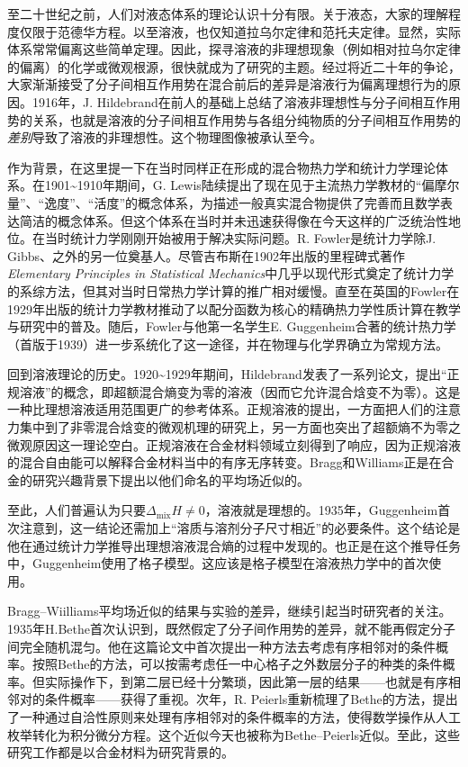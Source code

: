 \documentclass[main.tex]{subfiles}
\begin{document}
至二十世纪之前，人们对液态体系的理论认识十分有限。关于液态，大家的理解程度仅限于范德华方程。以至溶液，也仅知道拉乌尔定律和范托夫定律。显然，实际体系常常偏离这些简单定理。因此，探寻溶液的非理想现象（例如相对拉乌尔定律的偏离）的化学或微观根源，很快就成为了研究的主题\cite{Hildebrand1981}。经过将近二十年的争论，大家渐渐接受了分子间相互作用势在混合前后的差异是溶液行为偏离理想行为的原因。1916年，J. Hildebrand在前人的基础上总结了溶液非理想性与分子间相互作用势的关系\cite{Hildebrand1916}，也就是溶液的分子间相互作用势与各组分纯物质的分子间相互作用势的\emph{差别}导致了溶液的非理想性。这个物理图像被承认至今。

作为背景，在这里提一下在当时同样正在形成的混合物热力学和统计力学理论体系。在1901\textasciitilde 1910年期间，G. Lewis陆续提出了现在见于主流热力学教材的“偏摩尔量”、“逸度”、“活度”的概念体系\cite{Lewis1901,Lewis1907}，为描述一般真实混合物提供了完善而且数学表达简洁的概念体系。但这个体系在当时并未迅速获得像在今天这样的广泛统治性地位。在当时统计力学刚刚开始被用于解决实际问题。R. Fowler是统计力学除J. Gibbs、之外的另一位奠基人。尽管吉布斯在1902年出版的里程碑式著作\emph{Elementary Principles in Statistical Mechanics}\cite{Gibbs1902}中几乎以现代形式奠定了统计力学的系综方法，但其对当时日常热力学计算的推广相对缓慢。直至在英国的Fowler在1929年出版的统计力学教材\cite{Fowler1929}推动了以配分函数为核心的精确热力学性质计算在教学与研究中的普及。随后，Fowler与他第一名学生E. Guggenheim合著的统计热力学（首版于1939）\cite{Fowler1939}进一步系统化了这一途径，并在物理与化学界确立为常规方法。

回到溶液理论的历史。1920\textasciitilde 1929年期间，Hildebrand发表了一系列论文，提出“正规溶液”的概念\cite{Hildebrand1951}，即超额混合熵变为零的溶液（因而它允许混合焓变不为零）。这是一种比理想溶液适用范围更广的参考体系。正规溶液的提出，一方面把人们的注意力集中到了非零混合焓变的微观机理的研究上，另一方面也突出了超额熵不为零之微观原因这一理论空白。正规溶液在合金材料领域立刻得到了响应，因为正规溶液的混合自由能可以解释合金材料当中的有序无序转变。Bragg和Williams\cite{Bragg1934,Bragg1935}正是在合金的研究兴趣背景下提出以他们命名的平均场近似的。

至此，人们普遍认为只要$\Delta_\text{mix}H\neq 0$，溶液就是理想的。1935年，Guggenheim首次注意到\cite{Guggenheim1935}，这一结论还需加上“溶质与溶剂分子尺寸相近”的必要条件。这个结论是他在通过统计力学推导出理想溶液混合熵的过程中发现的。也正是在这个推导任务中，Guggenheim使用了格子模型。这应该是格子模型在溶液热力学中的首次使用。

Bragg--Wiilliams平均场近似的结果与实验的差异，继续引起当时研究者的关注。1935年H.Bethe首次认识到，既然假定了分子间作用势的差异，就不能再假定分子间完全随机混匀\cite{Bethe1935}。他在这篇论文中首次提出一种方法去考虑有序相邻对的条件概率。按照Bethe的方法，可以按需考虑任一中心格子之外数层分子的种类的条件概率。但实际操作下，到第二层已经十分繁琐，因此第一层的结果——也就是有序相邻对的条件概率——获得了重视。次年，R. Peierls重新梳理了Bethe的方法，提出了一种通过自洽性原则来处理有序相邻对的条件概率的方法\cite{Peierls1936}，使得数学操作从人工枚举转化为积分微分方程。这个近似今天也被称为Bethe--Peierls近似。至此，这些研究工作都是以合金材料为研究背景的。
\end{document}
